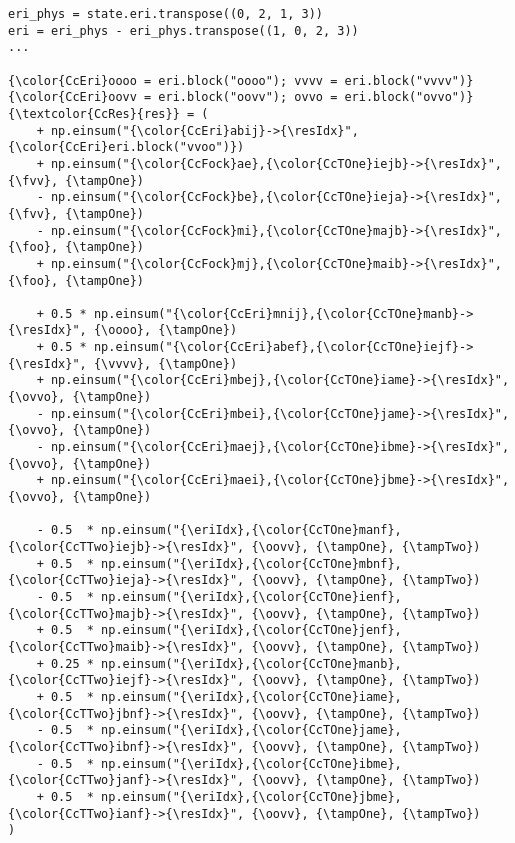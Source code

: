 \begin{minipage}{0.50\textwidth}
\newcommand{\vvoo}{\textcolor{CcEri}{vvoo}}
\newcommand{\oovv}{\textcolor{CcEri}{oovv}}
\newcommand{\ovvo}{\textcolor{CcEri}{ovvo}}
\newcommand{\oooo}{\textcolor{CcEri}{oooo}}
\newcommand{\vvvv}{\textcolor{CcEri}{vvvv}}
\newcommand{\fvv}{\textcolor{CcFock}{state.fock.block("vv")}}
\newcommand{\foo}{\textcolor{CcFock}{state.fock.block("oo")}}
\newcommand{\eriIdx}{\textcolor{CcEri}{mnef}}
\newcommand{\tampOne}{\textcolor{CcTOne}{t2}}
\newcommand{\tampTwo}{\textcolor{CcTTwo}{t2}}
\newcommand{\resIdx}{\textcolor{CcRes}{iajb}}
\begin{BVerbatim}[commandchars=\\\{\},fontsize={\smaller}]
eri_phys = state.eri.transpose((0, 2, 1, 3))
eri = eri_phys - eri_phys.transpose((1, 0, 2, 3))
...

{\color{CcEri}oooo = eri.block("oooo"); vvvv = eri.block("vvvv")}
{\color{CcEri}oovv = eri.block("oovv"); ovvo = eri.block("ovvo")}
{\textcolor{CcRes}{res}} = (
    + np.einsum("{\color{CcEri}abij}->{\resIdx}", {\color{CcEri}eri.block("vvoo")})
    + np.einsum("{\color{CcFock}ae},{\color{CcTOne}iejb}->{\resIdx}", {\fvv}, {\tampOne})
    - np.einsum("{\color{CcFock}be},{\color{CcTOne}ieja}->{\resIdx}", {\fvv}, {\tampOne})
    - np.einsum("{\color{CcFock}mi},{\color{CcTOne}majb}->{\resIdx}", {\foo}, {\tampOne})
    + np.einsum("{\color{CcFock}mj},{\color{CcTOne}maib}->{\resIdx}", {\foo}, {\tampOne})

    + 0.5 * np.einsum("{\color{CcEri}mnij},{\color{CcTOne}manb}->{\resIdx}", {\oooo}, {\tampOne})
    + 0.5 * np.einsum("{\color{CcEri}abef},{\color{CcTOne}iejf}->{\resIdx}", {\vvvv}, {\tampOne})
    + np.einsum("{\color{CcEri}mbej},{\color{CcTOne}iame}->{\resIdx}", {\ovvo}, {\tampOne})
    - np.einsum("{\color{CcEri}mbei},{\color{CcTOne}jame}->{\resIdx}", {\ovvo}, {\tampOne})
    - np.einsum("{\color{CcEri}maej},{\color{CcTOne}ibme}->{\resIdx}", {\ovvo}, {\tampOne})
    + np.einsum("{\color{CcEri}maei},{\color{CcTOne}jbme}->{\resIdx}", {\ovvo}, {\tampOne})

    - 0.5  * np.einsum("{\eriIdx},{\color{CcTOne}manf},{\color{CcTTwo}iejb}->{\resIdx}", {\oovv}, {\tampOne}, {\tampTwo})
    + 0.5  * np.einsum("{\eriIdx},{\color{CcTOne}mbnf},{\color{CcTTwo}ieja}->{\resIdx}", {\oovv}, {\tampOne}, {\tampTwo})
    - 0.5  * np.einsum("{\eriIdx},{\color{CcTOne}ienf},{\color{CcTTwo}majb}->{\resIdx}", {\oovv}, {\tampOne}, {\tampTwo})
    + 0.5  * np.einsum("{\eriIdx},{\color{CcTOne}jenf},{\color{CcTTwo}maib}->{\resIdx}", {\oovv}, {\tampOne}, {\tampTwo})
    + 0.25 * np.einsum("{\eriIdx},{\color{CcTOne}manb},{\color{CcTTwo}iejf}->{\resIdx}", {\oovv}, {\tampOne}, {\tampTwo})
    + 0.5  * np.einsum("{\eriIdx},{\color{CcTOne}iame},{\color{CcTTwo}jbnf}->{\resIdx}", {\oovv}, {\tampOne}, {\tampTwo})
    - 0.5  * np.einsum("{\eriIdx},{\color{CcTOne}jame},{\color{CcTTwo}ibnf}->{\resIdx}", {\oovv}, {\tampOne}, {\tampTwo})
    - 0.5  * np.einsum("{\eriIdx},{\color{CcTOne}ibme},{\color{CcTTwo}janf}->{\resIdx}", {\oovv}, {\tampOne}, {\tampTwo})
    + 0.5  * np.einsum("{\eriIdx},{\color{CcTOne}jbme},{\color{CcTTwo}ianf}->{\resIdx}", {\oovv}, {\tampOne}, {\tampTwo})
)
\end{BVerbatim}
\end{minipage}
